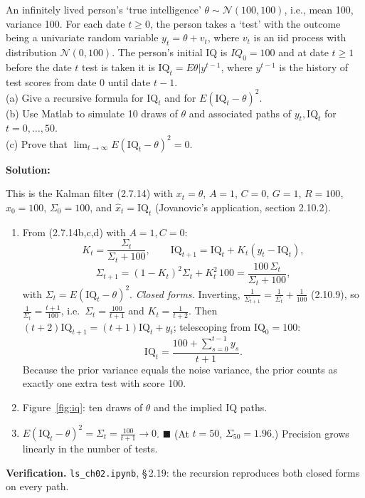 \documentclass[12pt, letterpaper]{article}
\newcommand{\nb}[1]{\texttt{ls\_ch02.ipynb}, \S\,#1}
\begin{document}
\begin{tcolorbox}[oddbox,title={Exercise 2.19 \quad IQ}]
\begin{tcolorbox}[questionbox]
An infinitely lived person's `true intelligence' $\theta\sim\mathcal N(100,100)$, i.e., mean 100,
variance 100. For each date $t\ge0$, the person takes a `test' with the outcome being a univariate
random variable $y_t=\theta+v_t$, where $v_t$ is an iid process with distribution $\mathcal N(0,100)$.
The person's initial IQ is $IQ_0=100$ and at date $t\ge1$ before the date $t$ test is taken it is
$\text{IQ}_t=E\theta|y^{t-1}$, where $y^{t-1}$ is the history of test scores from date 0 until date
$t-1$.\\[3pt]
(a) Give a recursive formula for $\text{IQ}_t$ and for $E(\text{IQ}_t-\theta)^2$.\\
(b) Use Matlab to simulate 10 draws of $\theta$ and associated paths of $y_t,\text{IQ}_t$ for
$t=0,\dots,50$.\\
(c) Prove that $\lim_{t\to\infty}E(\text{IQ}_t-\theta)^2=0$.
\end{tcolorbox}

\textbf{Solution:}

This is the Kalman filter (2.7.14) with $x_t=\theta$, $A=1$, $C=0$, $G=1$, $R=100$, $\hat x_0=100$,
$\Sigma_0=100$, and $\hat x_t=\text{IQ}_t$ (Jovanovic's application, section 2.10.2).
\begin{enumerate}
\item From (2.7.14b,c,d) with $A=1,C=0$:
\[
K_t=\frac{\Sigma_t}{\Sigma_t+100},\qquad \boxed{\text{IQ}_{t+1}=\text{IQ}_t+K_t(y_t-\text{IQ}_t)},
\]
\[
\boxed{\Sigma_{t+1}=(1-K_t)^2\Sigma_t+K_t^2\,100=\frac{100\,\Sigma_t}{\Sigma_t+100}},
\]
with $\Sigma_t=E(\text{IQ}_t-\theta)^2$. \emph{Closed forms.} Inverting, $\frac1{\Sigma_{t+1}}=
\frac1{\Sigma_t}+\frac1{100}$ (2.10.9), so $\frac{1}{\Sigma_t}=\frac{t+1}{100}$, i.e.\
$\Sigma_t=\frac{100}{t+1}$ and $K_t=\frac{1}{t+2}$. Then $(t+2)\text{IQ}_{t+1}=(t+1)\text{IQ}_t+y_t$;
telescoping from $\text{IQ}_0=100$:
\[
\text{IQ}_t=\frac{100+\sum_{s=0}^{t-1}y_s}{t+1}.
\]
Because the prior variance equals the noise variance, the prior counts as exactly one extra test
with score 100.
\item Figure~\ref{fig:iq}: ten draws of $\theta$ and the implied IQ paths.
\item $E(\text{IQ}_t-\theta)^2=\Sigma_t=\frac{100}{t+1}\to0$. $\blacksquare$ (At $t=50$,
$\Sigma_{50}=1.96$.) Precision grows linearly in the number of tests.
\end{enumerate}

\textbf{Verification.} \nb{2.19}: the recursion reproduces both closed forms on every path. \checkmark
\end{tcolorbox}
\end{document}
